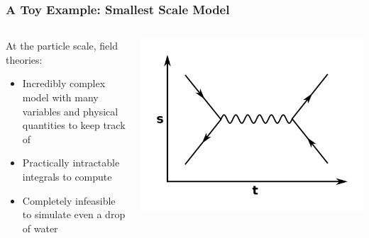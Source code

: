 \documentclass[aspectratio=169, 12pt]{beamer}
\begin{document}
\begin{frame}

    \frametitle{A Toy Example: Smallest Scale Model}

    \begin{columns}
    \begin{column}{.6\textwidth}
        At the particle scale, field theories:

        \begin{itemize}
            \item Incredibly complex model with many variables and physical quantities to keep track of
            \item Practically intractable integrals to compute
            \item Completely infeasible to simulate even a drop of water
        \end{itemize}
        
    \end{column}
    \begin{column}{.4\textwidth}
        \includegraphics[width=\textwidth]{images/feynman-diagram.jpg}
    \end{column}
    \end{columns}

\end{frame}
\end{document}
